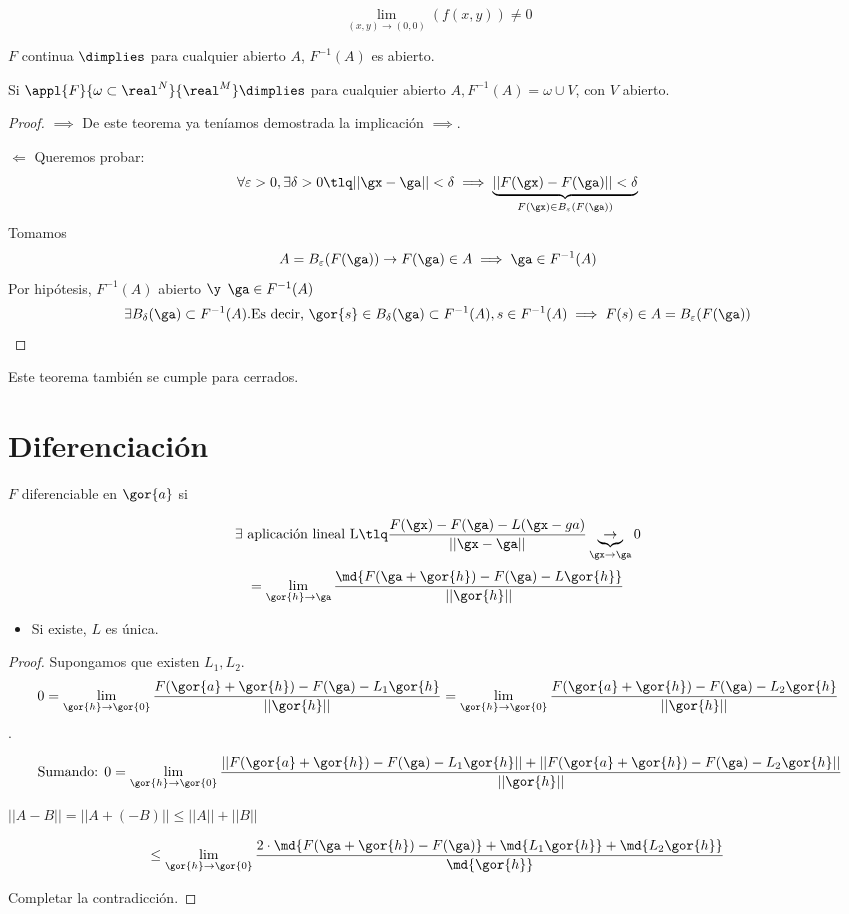 \documentclass{apuntes}
\begin{document}
 $$\lim_{(x,y) \rightarrow (0,0)} (f(x,y)) \neq 0$$
 
 
\begin{theorem}
 $F$ continua $\dimplies$ para cualquier abierto $A$, $F^{-1}(A)$ es abierto.
\end{theorem}
\obs
Si $\appl{F}{\omega\subset\real^N}{\real^M} \dimplies$ para cualquier abierto $A, F^{-1}(A) = \omega \cup V$, con $V$ abierto.

\begin{proof}
$\implies$ De este teorema ya teníamos demostrada la implicación $\implies$.

$\Leftarrow$ Queremos probar: $$\forall \varepsilon > 0, \exists \delta>0 \tlq ||\gx-\ga||<\delta \implies \underbrace{||F(\gx)-F(\ga)||<\delta}_{F(\gx)\in B_{\varepsilon}(F(\ga))}$$
Tomamos  $$A = B_{\varepsilon}(F(\ga)) \rightarrow F(\ga) \in A \implies \ga \in F^{-1}(A)$$
Por hipótesis, $F^{-1}(A)$ abierto $\y$ $\ga \in F^{-1}(A)$
$$\exists B_{\delta}(\ga) \subset F^{-1}(A) \text{.Es decir, } \gor{s}\in B_{\delta}(\ga) \subset F^{-1}(A), s\in F^{-1}(A) \implies F(s) \in A = B_{\varepsilon}(F(\ga))$$

\end{proof}
\begin{remark}
Este teorema también se cumple para cerrados.
\end{remark}
\section{Diferenciación}

\begin{defn}
 $F$ diferenciable en $\gor{a}$ si 
 
 $$\exists \text{ aplicación lineal L} \tlq \frac{F(\gx)-F(\ga)-L(\gx-ga)}{||\gx-\ga||} \underbrace{\rightarrow}_{\gx\rightarrow\ga} 0$$
$$ = \lim_{\gor{h} \rightarrow \ga} \frac{\md{F(\ga+\gor{h}) - F(\ga) - L\gor{h}}}{||\gor{h}||}$$

\end{defn}


\obs
\begin{itemize}
\item Si existe, $L$ es única.
\end{itemize}

\begin{proof}
Supongamos que existen $L_1,L_2$.
\[0=\lim_{\gor{h} \rightarrow \gor{0}} \frac{F(\gor{a}+\gor{h}) - F(\ga)-L_1\gor{h}}{||\gor{h}||} = \lim_{\gor{h} \rightarrow \gor{0}} \frac{F(\gor{a}+\gor{h}) - F(\ga)-L_2\gor{h}}{||\gor{h}||}\].

$$\text{ Sumando: } 0 = \lim_{\gor{h} \rightarrow \gor{0}} \frac{||F(\gor{a}+\gor{h}) - F(\ga)-L_1\gor{h}|| + ||F(\gor{a}+\gor{h}) - F(\ga) -L_2\gor{h}||}{||\gor{h}||}$$

\obs $||A-B|| = ||A+(-B)|| \leq ||A||+||B||$

$$\leq \lim_{\gor{h} \rightarrow \gor{0}} \frac{2\cdot\md{F(\ga + \gor{h}) - F(\ga)} + \md{L_1\gor{h}} + \md{L_2\gor{h}}}{\md{\gor{h}}}$$

Completar la contradicción.
\end{proof}
\end{document}
